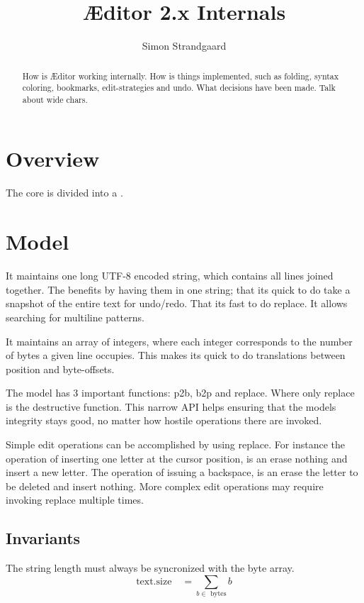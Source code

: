 \documentclass[a4paper,12pt]{article}
\author{Simon Strandgaard}
\title{\AE ditor 2.x Internals}
\begin{document}
\maketitle

\begin{abstract}
How is \AE ditor working internally. How is things implemented,
such as folding, syntax coloring, bookmarks, edit-strategies and undo. 
What decisions have been made. Talk about wide chars.
\end{abstract}

\section{Overview}
The core is divided into a .


\section{Model}
It maintains one long UTF-8 encoded string, which contains all
lines joined together. The benefits by having them in one string; 
that its quick to do take a snapshot of the entire text for undo/redo. 
That its fast to do replace. It allows searching for multiline patterns.

It maintains an array of integers, where each integer corresponds to 
the number of bytes a given line occupies. This makes its quick to 
do translations between position and byte-offsets.

The model has 3 important functions: p2b, b2p and replace.
Where only replace is the destructive function.
This narrow API helps ensuring that the models integrity stays good, 
no matter how hostile operations there are invoked.

Simple edit operations can be accomplished by using replace. For
instance the operation of inserting one letter at the cursor position,
is an erase nothing and insert a new letter. The operation of
issuing a backspace, is an erase the letter to be deleted and
insert nothing. More complex edit operations may require invoking 
replace multiple times.


\subsection{Invariants}
The string length must always be syncronized with the byte array.
\begin{equation}
\textrm{text.size} \quad = {\sum_{b \in \textrm{ bytes}} \!\!\! b}
\end{equation}
\end{document}
